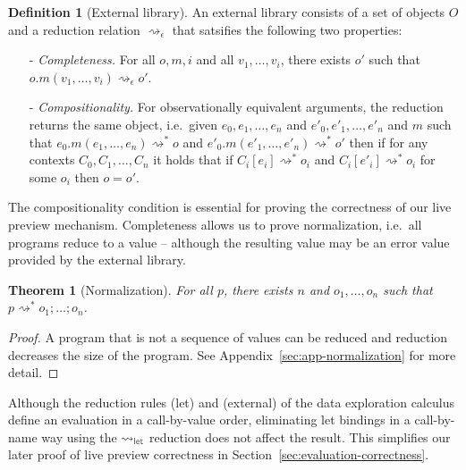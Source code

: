\documentclass[acmsmall,anonymous,fleqn]{acmart}\settopmatter{printfolios=false,printccs=false,printacmref=false}
\newcounter{thc}
\newcounter{dfc}
\theoremstyle{plain}
\newtheorem{theorem}[thc]{Theorem}
\theoremstyle{definition}
\newtheorem{definition}[dfc]{Definition}
\newcommand{\ident}[1]{\textnormal{\textcolor{idclr}{\sffamily #1}}}
\newcommand{\rname}[1]{{\sffamily\small(#1)}}
\begin{document}
\begin{definition}[External library]
\label{def:external}
An external library consists of a set of objects $O$ and a reduction relation
$\rightsquigarrow_\epsilon$ that satsifies the following two properties:
\begin{itemize}
\item[-] \emph{Completeness.} For all $o, m, i$ and all $v_1, \ldots, v_i$, there exists $o'$ such
  that $o.m(v_1, \ldots, v_i) \rightsquigarrow_\epsilon o'$.
\vspace{0.5em}
\item[-] \emph{Compositionality.} For observationally equivalent arguments, the reduction returns
  the same object, i.e.~given $e_0, e_1, \ldots, e_n$ and $e'_0, e'_1, \ldots, e'_n$ and $m$ such that
  $e_0.m(e_1, \ldots, e_n) \rightsquigarrow^{*} o$ and $e'_0.m(e'_1, \ldots, e'_n) \rightsquigarrow^{*} o'$ then
  if for any contexts $C_0, C_1, \ldots, C_n$ it holds that if $C_i[e_i] \rightsquigarrow^{*} o_i$ and
  $C_i[e'_i] \rightsquigarrow^{*} o_i$ for some $o_i$ then $o = o'$.
\end{itemize}
\end{definition}

\noindent
The compositionality condition is essential for proving the correctness of our live preview mechanism.
Completeness allows us to prove normalization, i.e.~all programs reduce to
a value -- although the resulting value may be an error value provided by the external library.

\begin{theorem}[Normalization]
\label{thm:normalization}
For all $p$, there exists $n$ and $o_1, \ldots, o_n$ such that $p\rightsquigarrow^{*} o_1;\ldots;o_n$.
\end{theorem}
\begin{proof}
A program that is not a sequence of values can be reduced and reduction decreases the size of the
program. See Appendix~\ref{sec:app-normalization} for more detail.
\end{proof}

\noindent
Although the reduction rules \rname{let} and \rname{external} of the data exploration calculus
define an evaluation in a call-by-value order, eliminating let bindings in a call-by-name way
using the $\rightsquigarrow_\ident{let}$ reduction does not affect the result. This
simplifies our later proof of live preview correctness in Section~\ref{sec:evaluation-correctness}.
\end{document}
